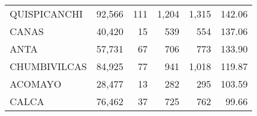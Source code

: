 \begin{tabular}{lrrrrr}
	\cellcolor[HTML]{FFFFC7}QUISPICANCHI                                              & 92,566                                                         & 111                                                      & 1,204                                                    & 1,315                                                               & 142.06                                                                       \\
	\cellcolor[HTML]{FFFFC7}CANAS                                                     & 40,420                                                         & 15                                                       & 539                                                      & 554                                                                 & 137.06                                                                       \\
	\cellcolor[HTML]{FFFFC7}ANTA                                                      & 57,731                                                         & 67                                                       & 706                                                      & 773                                                                 & 133.90                                                                       \\
	\cellcolor[HTML]{9AFF99}CHUMBIVILCAS                                              & 84,925                                                         & 77                                                       & 941                                                      & 1,018                                                               & 119.87                                                                       \\
	\cellcolor[HTML]{9AFF99}ACOMAYO                                                   & 28,477                                                         & 13                                                       & 282                                                      & 295                                                                 & 103.59                                                                       \\
	\cellcolor[HTML]{9AFF99}CALCA                                                     & 76,462                                                         & 37                                                       & 725                                                      & 762                                                                 & 99.66                                                                        \\

\end{tabular}
